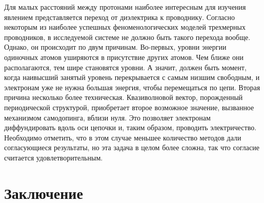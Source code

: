 \documentclass[a4paper, 14pt]{extarticle}
\begin{document}
Для малых расстояний между протонами наиболее интересным для изучения 
явлением представляется переход от диэлектрика к проводнику. Согласно 
некоторым из наиболее успешных феноменологических моделей трехмерных 
проводников, в исследуемой системе не должно быть такого перехода 
вообще. Однако, он происходит по двум причинам. Во-первых, уровни 
энергии одиночных атомов уширяются в присутствие других атомов. Чем 
ближе они располагаются, тем шире становятся уровни. А значит, должен 
быть момент, когда наивысший занятый уровень перекрывается с самым 
низшим свободным, и электронам уже не нужна большая энергия, чтобы 
перемещаться по цепи. Вторая причина несколько более техническая. 
Квазиволновой вектор, порожденный периодической структурой, приобретает 
второе возможное значение, вызванное механизмом самодопинга, вблизи 
нуля. Это позволяет электронам диффундировать вдоль оси цепочки и, таким 
образом, проводить электричество. Необходимо отметить, что в этом случае 
меньшее количество методов дали согласующиеся результаты, но эта задача 
в целом более сложна, так что согласие считается удовлетворительным.




\clearpage \section{Заключение}
\end{document}
